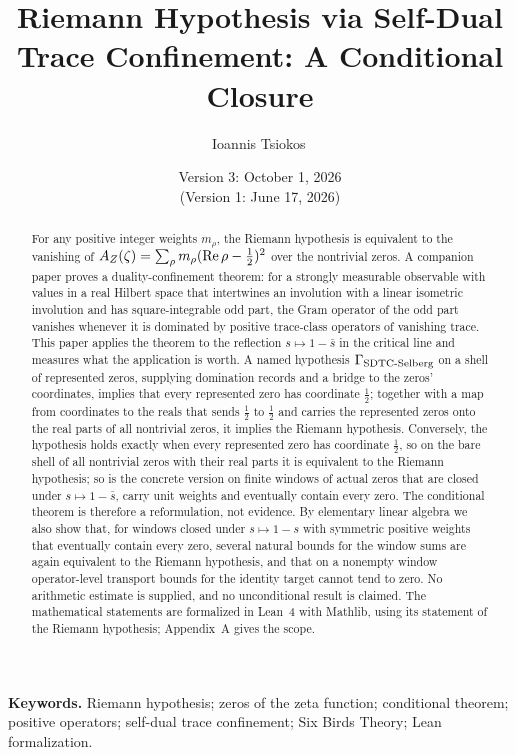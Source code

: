 \documentclass[11pt]{article}
\title{Riemann Hypothesis via Self-Dual Trace Confinement: A Conditional Closure}
\author{Ioannis Tsiokos\,\orcidlink{0009-0009-7659-5964}}
\date{Version 3: October 1, 2026\\[2pt] \footnotesize (Version 1: June 17, 2026)}
\theoremstyle{definition}
\begin{document}
\maketitle
\thispagestyle{firstpage}

\begin{abstract}
For any positive integer weights \(m_\rho\), the Riemann hypothesis is
equivalent to the vanishing of \(A_{Z}(\zeta)=\sum_\rho m_\rho(\operatorname{Re}\rho-\frac12)^2\)
over the nontrivial zeros.  A companion paper proves a
duality-confinement theorem: for a strongly measurable observable with
values in a real Hilbert space that intertwines an involution with a
linear isometric involution and has square-integrable odd part, the
Gram operator of the odd part vanishes whenever it is dominated by
positive trace-class operators of vanishing trace.  This paper applies
the theorem to the reflection \(s\mapsto1-\bar s\) in the critical line
and measures what the application is worth.  A named hypothesis
\(\Gamma_{\mathrm{SDTC\text{-}Selberg}}\) on a shell of represented zeros, supplying
domination records and a bridge to the zeros' coordinates, implies that
every represented zero has coordinate \(\frac12\); together with a map
from coordinates to the reals that sends \(\frac12\) to \(\frac12\) and
carries the represented zeros onto the real parts of all nontrivial
zeros, it implies the Riemann hypothesis.  Conversely, the hypothesis
holds exactly when every represented zero has coordinate \(\frac12\), so
on the bare shell of all nontrivial zeros with their real parts it is
equivalent to the Riemann hypothesis; so is the concrete version on
finite windows of actual zeros that are closed under
\(s\mapsto1-\bar s\), carry unit weights and eventually contain every
zero.  The conditional theorem is therefore a reformulation, not
evidence.  By elementary linear algebra we also show that, for windows
closed under \(s\mapsto1-s\) with symmetric positive weights that
eventually contain every zero, several natural bounds for the window
sums are again equivalent to the Riemann hypothesis, and that on a
nonempty window operator-level transport bounds for the identity
target cannot tend to zero.  No arithmetic estimate is supplied, and no
unconditional result is claimed.  The mathematical statements are
formalized in Lean~4 with Mathlib, using its statement of the Riemann
hypothesis; Appendix~A gives the scope.
\end{abstract}

\medskip
\noindent\textbf{Keywords.} Riemann hypothesis; zeros of the zeta function; conditional theorem; positive operators; self-dual trace confinement; Six Birds Theory; Lean formalization.
\end{document}
